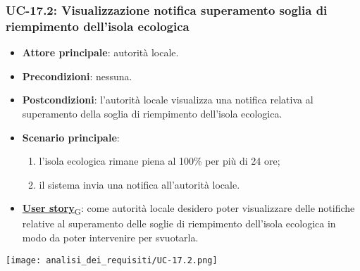 \subsubsection{UC-17.2: Visualizzazione notifica superamento soglia di riempimento dell'isola ecologica}
\begin{itemize}
	\item \textbf{Attore principale}: autorità locale.
	\item \textbf{Precondizioni}: nessuna.
	\item \textbf{Postcondizioni}: l'autorità locale visualizza una notifica relativa al superamento della soglia di riempimento dell'isola ecologica.
	\item \textbf{Scenario principale}:
	      \begin{enumerate}
		      \item l'isola ecologica rimane piena al 100\% per più di 24 ore;
		      \item il sistema invia una notifica all'autorità locale.
	      \end{enumerate}
	\item \href{https://7last.github.io/docs/pb/documentazione-interna/glossario\#user-story}{\textbf{User story}\textsubscript{G}}:
	      come autorità locale desidero poter visualizzare delle notifiche relative al superamento delle soglie di riempimento dell'isola ecologica
	      in modo da poter intervenire per svuotarla.
\end{itemize}
\begin{center}
	\texttt{[image: analisi\_dei\_requisiti/UC-17.2.png]}
\end{center}

